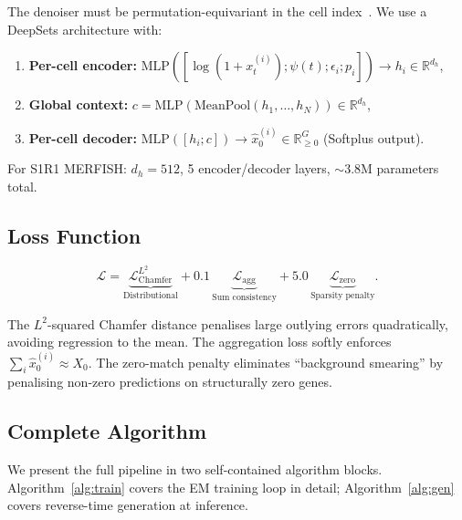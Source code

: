 \documentclass[11pt]{article}
\begin{document}
The denoiser must be permutation-equivariant in the cell index~\citep{zaheer2017deep}. We use a DeepSets architecture with:
\begin{enumerate}
  \item \textbf{Per-cell encoder:} $\text{MLP}([\log(1{+}x_t^{(i)}); \psi(t); \epsilon_i; p_i]) \to h_i \in \mathbb{R}^{d_h}$,
  \item \textbf{Global context:} $c = \text{MLP}(\text{MeanPool}(h_1, \ldots, h_N)) \in \mathbb{R}^{d_h}$,
  \item \textbf{Per-cell decoder:} $\text{MLP}([h_i; c]) \to \hat{x}_0^{(i)} \in \mathbb{R}^G_{\geq 0}$ (Softplus output).
\end{enumerate}
For S1R1 MERFISH: $d_h = 512$, 5 encoder/decoder layers, ${\sim}$3.8M parameters total.

\subsection{Loss Function}

\begin{equation}
  \mathcal{L} = \underbrace{\mathcal{L}_{\text{Chamfer}}^{L^2}}_{\text{Distributional}} + 0.1\,\underbrace{\mathcal{L}_{\text{agg}}}_{\text{Sum consistency}} + 5.0\,\underbrace{\mathcal{L}_{\text{zero}}}_{\text{Sparsity penalty}}.
\end{equation}

The $L^2$-squared Chamfer distance penalises large outlying errors quadratically, avoiding regression to the mean. The aggregation loss softly enforces $\sum_i \hat{x}_0^{(i)} \approx X_0$. The zero-match penalty eliminates ``background smearing'' by penalising non-zero predictions on structurally zero genes.

\subsection{Complete Algorithm}

We present the full pipeline in two self-contained algorithm blocks. Algorithm~\ref{alg:train} covers the EM training loop in detail; Algorithm~\ref{alg:gen} covers reverse-time generation at inference.
\end{document}
